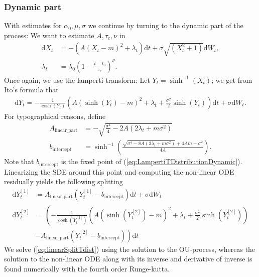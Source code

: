 \subsubsection{Dynamic part}
With estimates for $\alpha_0, \mu, \sigma$ we continue by turning to the dynamic part of the process: We want to estimate $A, \tau_c, \nu$ in
\begin{align}
    \mathrm{d}X_t &= -\left(A(X_t - m)^2 + \lambda_t\right)\mathrm{d}t + \sigma \sqrt{\left(X_t^2 + 1\right)}\mathrm{d}W_t,\\
    \lambda_t &= \lambda_0 \left(1 - \frac{t - t_0}{\tau_c}\right)^\nu.
\end{align}
Once again, we use the lamperti-transform: Let $Y_t = \sinh^{-1}(X_t)$; we get from Ito's formula that
\begin{align}
    \mathrm{d}Y_t = -\frac{1}{\cosh(Y_t)}\left(A\left(\sinh(Y_t) - m\right)^2 + \lambda_t + \frac{\sigma^2}{2}\sinh(Y_t)\right)\mathrm{d}t + \sigma \mathrm{d}W_t. \label{eq:LampertiTDistributionDynamic}
\end{align}
For typographical reasons, define
\begin{align}
    A_{\textrm{linear\_part}} &= -\sqrt{\frac{\sigma^4}{4} - 2A\left(2\lambda_t + m\sigma^2\right)}\\
    b_{\textrm{intercept}} &= \sinh^{-1}\left(\frac{\sqrt{\sigma^4 - 8A\left(2\lambda_t + m \sigma^2\right)} + 4 Am - \sigma^2}{4A}\right).
\end{align}
Note that $b_{\textrm{intercept}}$ is the fixed point of (\ref{eq:LampertiTDistributionDynamic}). Linearizing the SDE around this point and computing the non-linear ODE residually yields the following splitting
\begin{align}
    \mathrm{d}Y_t^{[1]} &= A_{\textrm{linear\_part}}\left(Y_t^{[1]} - b_{\textrm{intercept}}\right)\mathrm{d}t + \sigma \mathrm{d}W_t \label{eq:linearSplitTdist} \\
    \mathrm{d}Y_t^{[2]} &= \left(-\frac{1}{\cosh(Y_t^{[2]})}\left(A\left(\sinh(Y_t^{[2]}) - m\right)^2 + \lambda_t + \frac{\sigma^2}{2}\sinh(Y_t^{[2]})\right)\right.\\
     &\left.- A_{\textrm{linear\_part}}\left(Y_t^{[2]} - b_{\textrm{intercept}}\right)\right)\mathrm{d}t \label{eq:StrangTDiffusionDynamic}
\end{align}
We solve (\ref{eq:linearSplitTdist}) using the solution to the OU-process, whereas the solution to the non-linear ODE along with its inverse and derivative of inverse is found numerically with the fourth order Runge-kutta.
